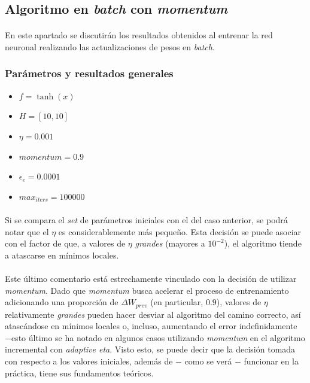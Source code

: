 \documentclass[12pt, twocolumn]{article}
\begin{document}
	
	\subsection{Algoritmo en \textit{batch} con \textit{momentum}}
	
	\paragraph{} En este apartado se discutirán los resultados obtenidos al entrenar la red neuronal realizando las actualizaciones de pesos en \textit{batch}.
	
	\subsubsection{Parámetros y resultados generales} 
	
	\begin{itemize}
		\item $f = \tanh(x)$
		\item $H = \left[10, 10\right]$
		\item $\eta = 0.001$
		\item $momentum = 0.9$
		\item $\epsilon_{e} = 0.0001$
		\item $max_{iters} = 100000$
	\end{itemize}
	
	\paragraph{} Si se compara el \textit{set} de parámetros iniciales con el del caso anterior, se podrá notar que el $\eta$ es considerablemente más pequeño. Esta decisión se puede asociar con el factor de que, a valores de $\eta$ \textit{grandes} (mayores a $10^{-2}$), el algoritmo tiende a atascarse en mínimos locales. 
	
	\paragraph{} Este último comentario está estrechamente vinculado con la decisión de utilizar \textit{momentum}. Dado que \textit{momentum} busca acelerar el proceso de entrenamiento adicionando una proporción de $\Delta W_{prev}$ (en particular, $0.9$), valores de $\eta$ relativamente \textit{grandes} pueden hacer desviar al algoritmo del camino correcto, así atascándose en mínimos locales o, incluso, aumentando el error indefinidamente $-$esto último se ha notado en algunos casos utilizando \textit{momentum} en el algoritmo incremental con \textit{adaptive eta}. Visto esto, se puede decir que la decisión tomada con respecto a los valores iniciales, además de $-$ como se verá $-$ funcionar en la práctica, tiene sus fundamentos teóricos.  
	
\end{document}
